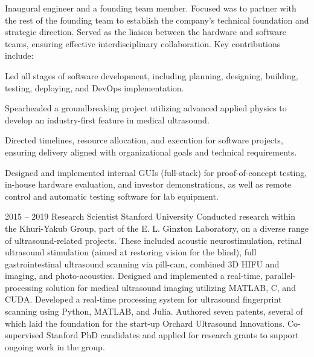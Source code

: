 \documentclass[8pt]{mofiicv}
\begin{document}
\begin{minipage}[T]{\SecondColumnWidth}
\begin{entrylist}
{			Inaugural engineer and a founding team member. Focused was to partner with the rest of the founding team to establish the company's technical foundation and strategic direction. Served as the liaison between the hardware and software teams, ensuring effective interdisciplinary collaboration. 
			Key contributions include:
			\begin{description}[noitemsep,font=\normalfont\itshape]
				\item[Software Development Leadership] Led all stages of software development, including planning, designing, building, testing, deploying, and DevOps implementation.
				\item[Nonlinear Signal Processing] Spearheaded a groundbreaking project utilizing advanced applied physics to develop an industry-first feature in medical ultrasound. 
				\item[Strategic Project Management]  Directed timelines, resource allocation, and execution for software projects, ensuring delivery aligned with organizational goals and technical requirements.
				\item[Innovative Software Solutions] Designed and implemented internal GUIs (full-stack) for proof-of-concept testing, in-house hardware evaluation, and investor demonstrations, as well as remote control and automatic testing software for lab equipment.
			\end{description}\vspace*{-0.9em}
			}
		\entry
			{2015 -- 2019}
			{Research Scientist}
			{Stanford University}
			{
			Conducted research within the Khuri-Yakub Group, part of the E. L. Ginzton Laboratory, on a diverse range of ultrasound-related projects. These included acoustic neurostimulation, retinal ultrasound stimulation (aimed at restoring vision for the blind), full gastrointestinal ultrasound scanning via pill-cam, combined 3D HIFU and imaging, and photo-acoustics. Designed and implemented a real-time, parallel-processing solution for medical ultrasound imaging utilizing MATLAB, C, and CUDA. Developed a real-time processing system for ultrasound fingerprint scanning using Python, MATLAB, and Julia. Authored seven patents, several of which laid the foundation for the start-up Orchard Ultrasound Innovations. Co-supervised Stanford PhD candidates and applied for research grants to support ongoing work in the group.\\ 
			}
		\entry

\end{entrylist}
\end{minipage}
\end{document}
